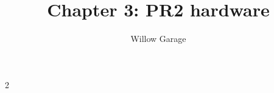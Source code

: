 \documentclass[11pt]{book}
\begin{document}
\title{Chapter 3: PR2 hardware }
\author{Willow Garage}
\newcommand{\TODO}[1]{\textcolor{red}{TODO: #1}}
\maketitle
\newpage
\tableofcontents
\newpage
\addtocounter {chapter} {2} 

\end{document}
